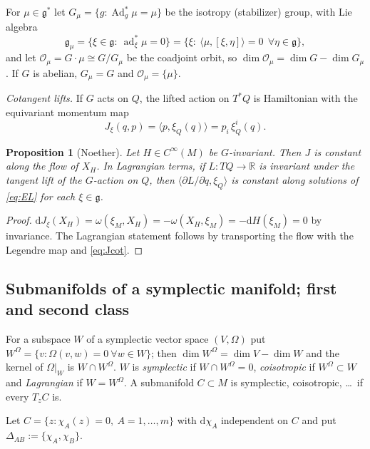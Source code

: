 \documentclass[11pt,a4paper]{article}
\numberwithin{equation}{section}
\theoremstyle{plain}
\newtheorem{proposition}[theorem]{Proposition}
\theoremstyle{definition}
\theoremstyle{remark}
\newcommand{\R}{\mathbb{R}}
\newcommand{\frakg}{\mathfrak{g}}
\newcommand{\Ad}{\operatorname{Ad}}
\newcommand{\ad}{\operatorname{ad}}
\newcommand{\pb}[2]{\{#1,#2\}}
\newcommand{\pair}[2]{\langle #1,#2\rangle}
\newcommand{\dd}{\mathrm{d}}
\begin{document}
For $\mu\in\frakg^*$ let $G_\mu=\{g:\Ad^*_g\mu=\mu\}$ be the isotropy (stabilizer) group, with Lie algebra
\begin{equation}\label{eq:gmu}
\frakg_\mu=\{\xi\in\frakg:\ \ad^*_\xi\mu=0\}=\{\xi:\ \pair\mu{[\xi,\eta]}=0\ \ \forall\eta\in\frakg\},
\end{equation}
and let $\mathcal O_\mu=G\cdot\mu\cong G/G_\mu$ be the coadjoint orbit, so $\dim\mathcal O_\mu=\dim G-\dim G_\mu$. If $G$ is abelian, $G_\mu=G$ and $\mathcal O_\mu=\{\mu\}$.

\medskip\noindent
\emph{Cotangent lifts.} If $G$ acts on $Q$, the lifted action on $T^*Q$ is Hamiltonian with the equivariant momentum map
\begin{equation}\label{eq:Jcot}
J_\xi(q,p)=\pair{p}{\xi_Q(q)}=p_i\,\xi_Q^i(q).
\end{equation}

\begin{proposition}[Noether]\label{prop:noether}
Let $H\in C^\infty(M)$ be $G$-invariant. Then $J$ is constant along the flow of $X_H$. In Lagrangian terms, if $L:TQ\to\R$ is invariant under the tangent lift of the $G$-action on $Q$, then $\pair{\partial L/\partial\dot q}{\xi_Q}$ is constant along solutions of \eqref{eq:EL} for each $\xi\in\frakg$.
\end{proposition}
\begin{proof}
$\dd J_\xi(X_H)=\omega(\xi_M,X_H)=-\omega(X_H,\xi_M)=-\dd H(\xi_M)=0$ by invariance. The Lagrangian statement follows by transporting the flow with the Legendre map and \eqref{eq:Jcot}.
\end{proof}

\subsection{Submanifolds of a symplectic manifold; first and second class}\label{sec:subman}

For a subspace $W$ of a symplectic vector space $(V,\Omega)$ put $W^\Omega=\{v:\Omega(v,w)=0\ \forall w\in W\}$; then $\dim W^\Omega=\dim V-\dim W$ and the kernel of $\Omega|_W$ is $W\cap W^\Omega$. $W$ is \emph{symplectic} if $W\cap W^\Omega=0$, \emph{coisotropic} if $W^\Omega\subset W$ and \emph{Lagrangian} if $W=W^\Omega$. A submanifold $C\subset M$ is symplectic, coisotropic, \dots\ if every $T_zC$ is.

Let $C=\{z:\chi_A(z)=0,\ A=1,\dots,m\}$ with $\dd\chi_A$ independent on $C$ and put $\Delta_{AB}:=\pb{\chi_A}{\chi_B}$.
\end{document}

